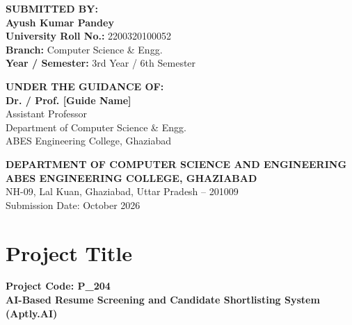 \documentclass[12pt, a4paper]{article}
\begin{document}
\begin{titlepage}
    \vfill
    
    \begin{minipage}[t]{0.48\textwidth}
        \flushleft
        {\large \textbf{\color{primary} SUBMITTED BY:}}\\[0.25cm]
        \textbf{\large Ayush Kumar Pandey}\\[0.1cm]
        \textbf{University Roll No.:} 2200320100052\\
        \textbf{Branch:} Computer Science \& Engg.\\
        \textbf{Year / Semester:} 3rd Year / 6th Semester
    \end{minipage}
    \hfill
    \begin{minipage}[t]{0.48\textwidth}
        \flushleft
        {\large \textbf{\color{primary} UNDER THE GUIDANCE OF:}}\\[0.25cm]
        \textbf{\large Dr. / Prof. [Guide Name]}\\[0.1cm]
        Assistant Professor\\
        Department of Computer Science \& Engg.\\
        ABES Engineering College, Ghaziabad
    \end{minipage}
    
    \vfill
    \vspace{0.6cm}
    
    {\small \textbf{DEPARTMENT OF COMPUTER SCIENCE AND ENGINEERING}}\\[0.1cm]
    {\large \textbf{\color{primary} ABES ENGINEERING COLLEGE, GHAZIABAD}}\\[0.1cm]
    {\small NH-09, Lal Kuan, Ghaziabad, Uttar Pradesh -- 201009}\\[0.15cm]
    {\footnotesize Submission Date: October 2026}
    \vspace*{0.2cm}
\end{titlepage}

\newpage

\setcounter{section}{1}

\section{Project Title}
\textbf{Project Code: P\_204}\\[0.2cm]
\textbf{AI-Based Resume Screening and Candidate Shortlisting System (Aptly.AI)}
\end{document}
